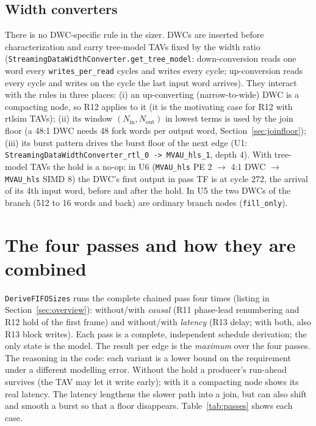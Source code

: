 \documentclass[10pt,a4paper]{article}
\newcommand{\code}[1]{\texttt{#1}}
\begin{document}
\subsection{Width converters}\label{sec:dwc}

There is no DWC-specific rule in the sizer. DWCs are inserted before
characterization and carry tree-model TAVs fixed by the width ratio
(\code{StreamingDataWidthConverter.get\_tree\_model}: down-conversion reads one word every
\code{writes\_per\_read} cycles and writes every cycle; up-conversion reads every
cycle and writes on the cycle the last input word arrives). They interact with the
rules in three places: (i) an up-converting (narrow-to-wide) DWC is a compacting
node, so R12 applies to it (it is the motivating case for R12 with rtlsim TAVs);
(ii) its window $(N_{\mathrm{in}},N_{\mathrm{out}})$ in lowest terms is used by the join floor (a 48:1 DWC needs 48
fork words per output word, Section~\ref{sec:joinfloor}); (iii) its burst pattern drives
the burst floor of the next edge (U1: \code{StreamingDataWidthConverter\_rtl\_0 ->
MVAU\_hls\_1}, depth 4). With tree-model TAVs the hold is a no-op: in U6
(\code{MVAU\_hls} PE 2 $\to$ 4:1 DWC $\to$ \code{MVAU\_hls} SIMD 8) the DWC's first output in
pass TF is at cycle 272, the arrival of its 4th input word, before and after the hold. In U5 the two DWCs
of the branch (512 to 16 words and back) are ordinary branch nodes (\code{fill\_only}).

\section{The four passes and how they are combined}\label{sec:passes}

\code{DeriveFIFOSizes} runs the complete chained pass four times (listing in
Section~\ref{sec:overview}): without/with \emph{causal} (R11 phase-lead renumbering and R12 hold of
the first frame) and without/with \emph{latency} (R13 delay; with both, also R13 block
writes). Each pass is a complete, independent schedule derivation; the only state
is the model. The result per edge is the \emph{maximum} over the four passes. The
reasoning in the code: each variant is a lower bound on the requirement under a
different modelling error. Without the hold a producer's run-ahead survives (the
TAV may let it write early); with it a compacting node shows its real latency. The
latency lengthens the slower path into a join, but can also shift and smooth a
burst so that a floor disappears. Table~\ref{tab:passes} shows each case.
\end{document}
